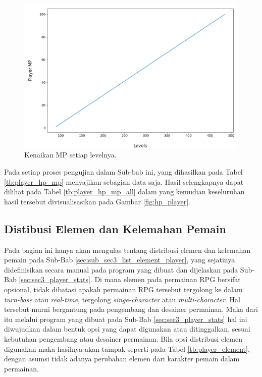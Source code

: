 \begin{figure} [!h] \centering
	\includegraphics[scale=0.44]{img/PlayerMpDistrib.png}
	\caption{Kenaikan MP setiap levelnya.}
	\label{fig:mp_player}
\end{figure}

Pada setiap proses pengujian dalam Sub-bab ini, yang dihasilkan pada Tabel \ref{tb:player_hp_mp} menyajikan sebagian data saja. Hasil selengkapnya dapat dilihat pada Tabel \ref{tb:player_hp_mp_all} dalam  yang kemudian keseluruhan hasil tersebut divisualisasikan pada Gambar \ref{fig:hp_player}.
\vspace{1ex}

\subsection{Distibusi Elemen dan Kelemahan Pemain}
\label{sec:sub_sec4_eval_dist_element_single-character}
\vspace{1ex}

Pada bagian ini hanya akan mengulas tentang distribusi elemen dan kelemahan pemain pada Sub-Bab \ref{sec:sub_sec3_list_element_player}, yang sejatinya didefinisikan secara manual pada program yang dibuat dan dijelaskan pada Sub-Bab \ref{sec:sec3_player_stats}. Di mana elemen pada permainan RPG bersifat opsional, tidak dibatasi apakah permainan RPG tersebut tergolong ke dalam \textit{turn-base} atau \textit{real-time}, tergolong \textit{singe-character} atau \textit{multi-character}. Hal tersebut murni bergantung pada pengembang dan desainer permainan. Maka dari itu melalui program yang dibuat pada Sub-Bab \ref{sec:sec3_player_stats} hal ini diwujudkan dalam bentuk opsi yang dapat digunakan atau ditinggalkan, sesuai kebutuhan pengembang atau desainer permainan. Bila opsi distribusi elemen digunakan maka hasilnya akan tampak seperti pada Tabel \ref{tb:player_element}, dengan asumsi tidak adanya perubahan elemen dari karakter pemain dalam permainan.
\vspace{-1ex}

